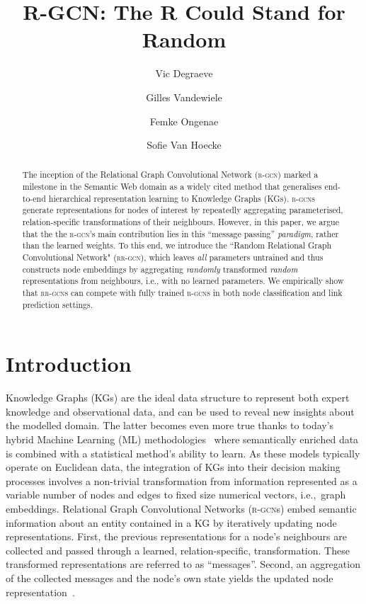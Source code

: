 \documentclass{llncs}
\begin{document}
\title{R-GCN: The R Could Stand for Random}
\author{Vic Degraeve \and Gilles Vandewiele \and
 Femke Ongenae \and
 Sofie Van Hoecke}

\maketitle             

\begin{abstract}
The inception of the Relational Graph Convolutional Network (\textsc{r-gcn}) marked a milestone in the Semantic Web domain as a widely cited method that generalises end-to-end hierarchical representation learning to Knowledge Graphs (KGs). \textsc{r-gcn}s generate representations for nodes of interest by repeatedly aggregating parameterised, relation-specific transformations of their neighbours. However, in this paper, we argue that the the \textsc{r-gcn}'s main contribution lies in this ``message passing'' \textit{paradigm}, rather than the learned weights. To this end, we introduce the ``Random Relational Graph Convolutional Network" (\textsc{rr-gcn}), which leaves \textit{all} parameters untrained and thus constructs node embeddings by aggregating \emph{randomly} transformed \textit{random} representations from neighbours, i.e., with no learned parameters. We empirically show that \textsc{rr-gcn}s can compete with fully trained \textsc{r-gcn}s in both node classification and link prediction settings.
\end{abstract}

\section{Introduction}
Knowledge Graphs (KGs) are the ideal data structure to represent both expert knowledge and observational data, and can be used to reveal new insights about the modelled domain. The latter becomes even more true thanks to today's hybrid Machine Learning (ML) methodologies~\cite{ristoski2016semantic,palmonari2020knowledge} where semantically enriched data is combined with a statistical method's ability to learn. As these models typically operate on Euclidean data, the integration of KGs into their decision making processes involves a non-trivial transformation from information represented as a variable number of nodes and edges to fixed size numerical vectors, i.e.,~graph embeddings. Relational Graph Convolutional Networks (\textsc{r\mbox{-}gcn}s) embed semantic information about an entity contained in a KG by iteratively updating node representations. First, the previous representations for a node's neighbours are collected and passed through a learned, relation-specific, transformation. These transformed representations are referred to as ``messages''. Second, an aggregation of the collected messages and the node's own state yields the updated node representation~\cite{battaglia2018relational}.
\end{document}
